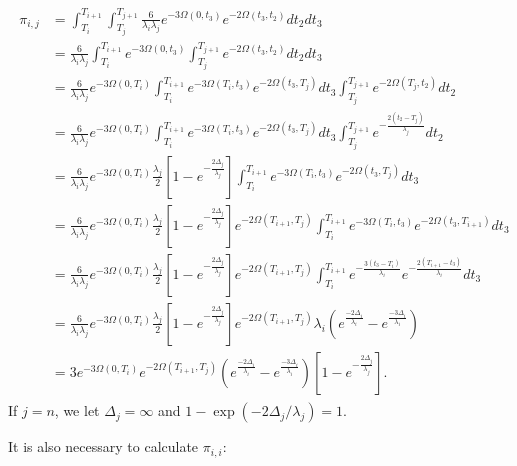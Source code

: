 \documentclass{article}
\begin{document}
\begin{align}
    \begin{split}
        \pi_{i,j} &=
        \int_{T_i}^{T_{i+1}}\int_{T_j}^{T_{j+1}}\frac{6}{\lambda_i\lambda_j}e^{-3\Omega(0,t_3)}e^{-2\Omega(t_3,t_2)}dt_2dt_3\\
        &= \frac{6}{\lambda_i\lambda_j}\int_{T_i}^{T_{i+1}}e^{-3\Omega(0,t_3)}\int_{T_j}^{T_{j+1}}e^{-2\Omega(t_3,t_2)}dt_2dt_3\\
        &= \frac{6}{\lambda_i\lambda_j}e^{-3\Omega(0,T_i)}\int_{T_i}^{T_{i+1}}e^{-3\Omega(T_i,t_3)}e^{-2\Omega(t_3,T_j)}dt_3
            \int_{T_j}^{T_{j+1}}e^{-2\Omega(T_j,t_2)}dt_2\\
        &= \frac{6}{\lambda_i\lambda_j}e^{-3\Omega(0,T_i)}\int_{T_i}^{T_{i+1}}e^{-3\Omega(T_i,t_3)}e^{-2\Omega(t_3,T_j)}dt_3
            \int_{T_j}^{T_{j+1}}e^{-\frac{2(t_2-T_j)}{\lambda_j}}dt_2\\
        &= \frac{6}{\lambda_i\lambda_j}e^{-3\Omega(0,T_i)}\frac{\lambda_j}{2}\left[1-e^{-\frac{2\Delta_j}{\lambda_j}}\right]
            \int_{T_i}^{T_{i+1}}e^{-3\Omega(T_i,t_3)}e^{-2\Omega(t_3,T_j)}dt_3\\
        &= \frac{6}{\lambda_i\lambda_j}e^{-3\Omega(0,T_i)}\frac{\lambda_j}{2}\left[1-e^{-\frac{2\Delta_j}{\lambda_j}}\right]
            e^{-2\Omega(T_{i+1},T_j)}
            \int_{T_i}^{T_{i+1}}e^{-3\Omega(T_i,t_3)}e^{-2\Omega(t_3,T_{i+1})}dt_3\\
        &= \frac{6}{\lambda_i\lambda_j}e^{-3\Omega(0,T_i)}\frac{\lambda_j}{2}\left[1-e^{-\frac{2\Delta_j}{\lambda_j}}\right]
            e^{-2\Omega(T_{i+1},T_j)}
            \int_{T_i}^{T_{i+1}}e^{-\frac{3(t_3-T_i)}{\lambda_i}}e^{-\frac{2(T_{i+1}-t_3)}{\lambda_i}}dt_3\\
        &= \frac{6}{\lambda_i\lambda_j}e^{-3\Omega(0,T_i)}\frac{\lambda_j}{2}\left[1-e^{-\frac{2\Delta_j}{\lambda_j}}\right]
            e^{-2\Omega(T_{i+1},T_j)}
            \lambda_i \left(e^{\frac{-2\Delta_i}{\lambda_i}}-e^{\frac{-3\Delta_i}{\lambda_i}}\right)\\
        &= 3e^{-3\Omega(0,T_i)}e^{-2\Omega(T_{i+1},T_j)}
            \left(e^{\frac{-2\Delta_i}{\lambda_i}}-e^{\frac{-3\Delta_i}{\lambda_i}}\right)
            \left[1-e^{-\frac{2\Delta_j}{\lambda_j}}\right].
    \end{split}
    \label{eq:pidiscrete}
\end{align}
If $j=n$, we let $\Delta_j = \infty$ and $1-\exp(-2\Delta_j/\lambda_j) = 1$.

It is also necessary to calculate $\pi_{i,i}$:
\end{document}
